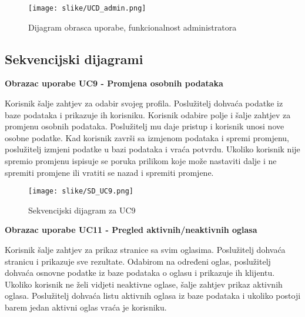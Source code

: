 				\begin{figure}[H]
					\texttt{[image: slike/UCD\_admin.png]}
					\centering
					\caption{Dijagram obrasca uporabe, funkcionalnost administratora}
					\label{fig:admin}
				\end{figure}

				\eject		
				
			\subsection{Sekvencijski dijagrami}
				
%				

			\textbf{Obrazac uporabe UC9 - Promjena osobnih podataka}
				
				\text Korisnik šalje zahtjev za odabir svojeg profila. Poslužitelj dohvaća podatke iz baze podataka i prikazuje ih korisniku. Korisnik odabire polje i šalje zahtjev za promjenu osobnih podataka. Poslužitelj mu daje pristup i korisnik unosi nove osobne podatke. Kad korisnik završi sa izmjenom podataka i spremi promjenu, poslužitelj izmjeni podatke u bazi podataka i vraća potvrdu. Ukoliko korisnik nije spremio promjenu ispisuje se poruka prilikom koje može nastaviti dalje i ne spremiti promjene ili vratiti se nazad i spremiti promjene.
				
				\begin{figure}[H]
					\texttt{[image: slike/SD\_UC9.png]}
					\centering
					\caption{Sekvencijski dijagram za UC9}
					\label{fig:UC9}
				\end{figure}
				
				
				\eject
				
			\textbf{Obrazac uporabe UC11 - Pregled aktivnih/neaktivnih oglasa}
				
				\text Korisnik šalje zahtjev za prikaz stranice sa svim oglasima. Poslužitelj dohvaća stranicu i prikazuje sve rezultate. Odabirom na određeni oglas, poslužitelj dohvaća osnovne podatke iz baze podataka o oglasu i prikazuje ih klijentu. Ukoliko korisnik ne želi vidjeti neaktivne oglase, šalje zahtjev prikaz aktivnih oglasa. Poslužitelj dohvaća listu aktivnih oglasa iz baze podataka i ukoliko postoji barem jedan aktivni oglas vraća je korisniku.
				

